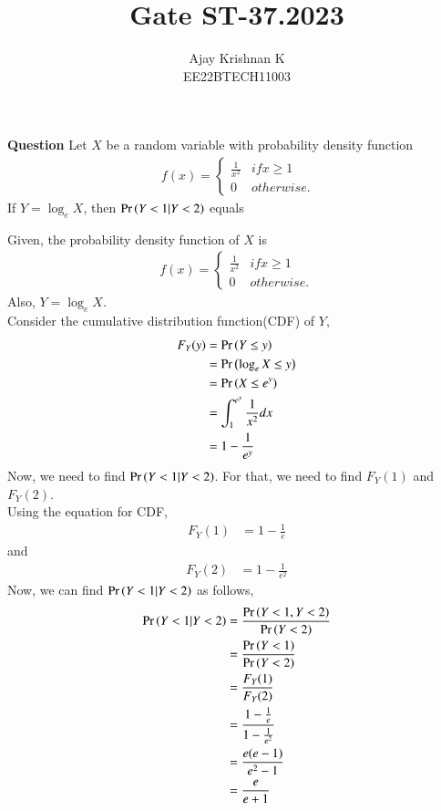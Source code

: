 \documentclass[journal,11pt]{IEEEtran}
\begin{document}
\vspace{3cm}
\author{Ajay Krishnan K\\EE22BTECH11003}

\title{Gate ST-37.2023}
\maketitle

\textbf{Question}
Let $X$ be a random variable with probability density function
\begin{align}\
    f(x) = \begin{cases}
        \frac{1}{x^2} & if x \geq 1\\
        0  & otherwise.
        \end{cases}
\end{align}
If $Y = \log_e X$, then $\Pr\left(Y<1 | Y<2 \right)$ equals

\solution
Given, the probability density function of $X$ is
\begin{align}
    f(x) = \begin{cases}
        \frac{1}{x^2} & if x \geq 1\\
        0  & otherwise.
        \end{cases}
\end{align}
Also, $Y = \log_e X$.\\
Consider the cumulative distribution function(CDF) of $Y$,
\begin{align}
    F_Y(y) &= \Pr\left(Y \leq y\right)\\
    &= \Pr\left(\log_e X \leq y\right)\\
    &= \Pr\left(X \leq e^y\right)\\
    &= \int_{1}^{e^y} \frac{1}{x^2} dx\\
    &= 1 - \frac{1}{e^y}
\end{align}
Now, we need to find $\Pr\left(Y<1 | Y<2 \right)$.
For that, we need to find $F_Y(1)$ and $F_Y(2)$.\\
Using the equation for CDF,
\begin{align}
    F_Y(1) &= 1 - \frac{1}{e}
\end{align}
and
\begin{align}
    F_Y(2) &= 1 - \frac{1}{e^2}
\end{align}
Now, we can find $\Pr\left(Y<1 | Y<2 \right)$ as follows,
\begin{align}
    \Pr\left(Y<1 | Y<2 \right) &= \frac{\Pr\left(Y<1 , Y<2\right)}{\Pr\left(Y<2\right)}\\
    &= \frac{\Pr\left(Y<1\right)}{\Pr\left(Y<2\right)}\\
    &= \frac{F_Y(1)}{F_Y(2)}\\
    &= \frac{1 - \frac{1}{e}}{1 - \frac{1}{e^2}}\\
    &= \frac{e(e-1)}{e^2-1}\\
    &= \frac{e}{e+1}
\end{align}
\end{document}
